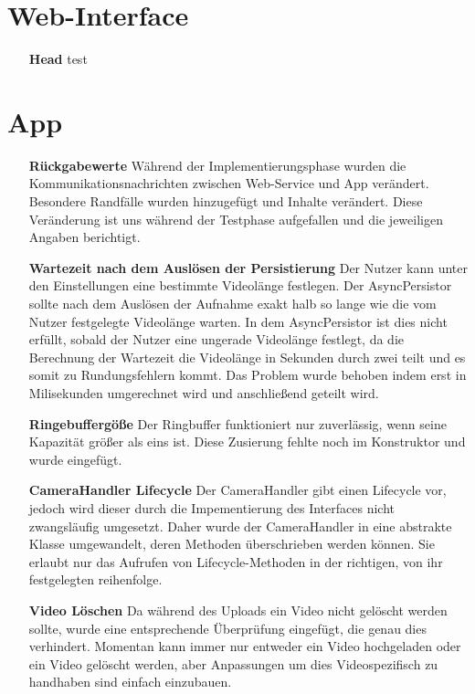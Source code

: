 \section{Web-Interface}
\begin{itemize}
\item [\textbf{Head}] test
\end{itemize}
\section{App}
\begin{itemize}
\item [\textbf{Rückgabewerte}] Während der Implementierungsphase wurden die Kommunikationsnachrichten zwischen Web-Service und App verändert. Besondere Randfälle wurden hinzugefügt und Inhalte verändert. Diese Veränderung ist uns während der Testphase aufgefallen und die jeweiligen Angaben berichtigt.
\item [\textbf{Wartezeit nach dem Auslösen der Persistierung}] Der Nutzer kann unter den Einstellungen eine bestimmte Videolänge festlegen. Der AsyncPersistor sollte nach dem Auslösen der Aufnahme exakt halb so lange wie die vom Nutzer festgelegte Videolänge warten. In dem AsyncPersistor ist dies nicht erfüllt, sobald der Nutzer eine ungerade Videolänge festlegt, da die Berechnung der Wartezeit die Videolänge in Sekunden durch zwei teilt und es somit zu Rundungsfehlern kommt. Das Problem wurde behoben indem erst in Milisekunden umgerechnet wird und anschließend geteilt wird.
\item [\textbf{Ringebuffergöße}] Der Ringbuffer funktioniert nur zuverlässig, wenn seine Kapazität größer als eins ist. Diese Zusierung fehlte noch im Konstruktor und wurde eingefügt.
\item [\textbf{CameraHandler Lifecycle}] Der CameraHandler gibt einen Lifecycle vor, jedoch wird dieser durch die Impementierung des Interfaces nicht zwangsläufig umgesetzt. Daher wurde der CameraHandler in eine abstrakte Klasse umgewandelt, deren Methoden überschrieben werden können. Sie erlaubt nur das Aufrufen von Lifecycle-Methoden in der richtigen, von ihr festgelegten reihenfolge.
\item [\textbf{Video Löschen}] Da während des Uploads ein Video nicht gelöscht werden sollte, wurde eine entsprechende Überprüfung eingefügt, die genau dies verhindert. Momentan kann immer nur entweder ein Video hochgeladen oder ein Video gelöscht werden, aber Anpassungen um  dies Videospezifisch zu handhaben sind einfach einzubauen.
\end{itemize}